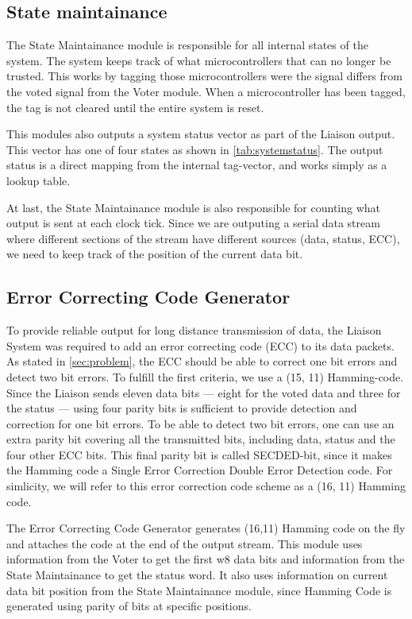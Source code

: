 \subsection{State maintainance}
The State Maintainance module is responsible for all internal states of the system. The system keeps track of what microcontrollers that can
no longer be trusted. This works by tagging those microcontrollers were the signal differs from the voted signal from the Voter module. When
a microcontroller has been tagged, the tag is not cleared until the entire system is reset.

This modules also outputs a system status vector as part of the Liaison output. This vector has one of four states as shown in \autoref{tab:systemstatus}.
The output status is a direct mapping from the internal tag-vector, and works simply as a lookup table.

At last, the State Maintainance module is also responsible for counting what output is sent at each clock tick. Since we are outputing a serial data stream
where different sections of the stream have different sources (data, status, ECC), we need to keep track of the position of the current data bit.

\subsection{Error Correcting Code Generator}
To provide reliable output for long distance transmission of data, the
Liaison System was required to add an error correcting code (ECC) to
its data packets. As stated in \autoref{sec:problem}, the ECC should
be able to correct one bit errors and detect two bit errors. To
fulfill the first criteria, we use a (15, 11)
Hamming-code\cite{ecc}. Since the Liaison sends eleven data bits ---
eight for the voted data and three for the status --- using four
parity bits is sufficient to provide detection and correction for one
bit errors. To be able to detect two bit errors, one can use an extra
parity bit covering all the transmitted bits, including data, status
and the four other ECC bits. This final parity bit is called
SECDED-bit, since it makes the Hamming code a Single Error Correction
Double Error Detection code\cite{ecc}. For simlicity, we will refer to
this error correction code scheme as a (16, 11) Hamming code.

The Error Correcting Code Generator generates (16,11) Hamming code on
the fly and attaches the code at the end of the output stream. This
module uses information from the Voter to get the first w8 data bits
and information from the State Maintainance to get the status word. It
also uses information on current data bit position from the State
Maintainance module, since Hamming Code is generated using parity of
bits at specific positions\cite{ecc}.

